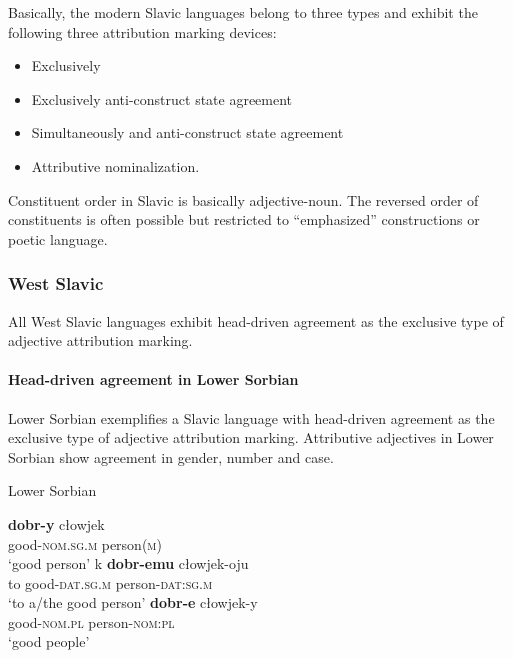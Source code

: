 Basically, the modern Slavic languages belong to three types and exhibit the following three attribution marking devices:
\begin{itemize}
\item Exclusively 
\item Exclusively anti\hyp{}construct state agreement
\item Simultaneously  and anti\hyp{}construct state agreement
\item Attributive nominalization.
\end{itemize}
Constituent order in Slavic is basically adjective-noun. The reversed order of constituents is often possible but restricted to “emphasized” constructions or poetic language. 

\subsubsection{West Slavic}
All West Slavic languages exhibit head\hyp{}driven agreement as the exclusive type of adjective attribution marking.

\paragraph*{Head\hyp{}driven agreement in Lower Sorbian}
Lower Sorbian exemplifies a Slavic language with head\hyp{}driven agreement as the exclusive type of adjective attribution marking. Attributive adjectives in Lower Sorbian show agreement in gender, number and case. 
\begin{exe}
\ex \rm{Lower Sorbian \citep{janas1976}}
\begin{xlist}
\ex
\gll	\textbf{dobr-y} cłowjek\\
	good-\textsc{nom.sg.m} person(\textsc{m})\\
\glt	‘good person’
\ex
\gll	k \textbf{dobr-emu} cłowjek-oju\\
	to good-\textsc{dat.sg.m} person-\textsc{dat:sg.m}\\
\glt	‘to a/the good person’
\ex
\gll	\textbf{dobr-e} cłowjek-y\\
	good-\textsc{nom.pl} person-\textsc{nom:pl}\\
\glt	‘good people’
\end{xlist}
\end{exe}

